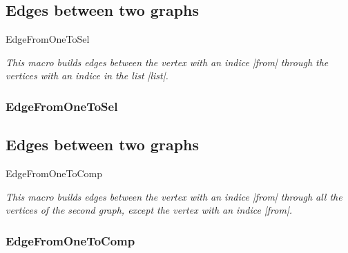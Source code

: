 \newpage
\subsection{Edges between two graphs }
\begin{NewMacroBox}{EdgeFromOneToSel}{}

\medskip
\emph{This macro  builds edges between the vertex with an indice |from| through the vertices with an indice in the list |list|.}
\end{NewMacroBox} 


\subsubsection{EdgeFromOneToSel}
\begin{center}
\begin{tkzexample}
\end{tkzexample}
\end{center}

\newpage  
\subsection{Edges between two graphs }
\begin{NewMacroBox}{EdgeFromOneToComp}{}

\medskip
\emph{This macro  builds edges between the vertex with an indice |from| through all the vertices of the second graph, except the vertex with an indice |from|.}
\end{NewMacroBox}  

\subsubsection{EdgeFromOneToComp}
\begin{center}
\begin{tkzexample}[vbox]
\end{tkzexample}
\end{center}

